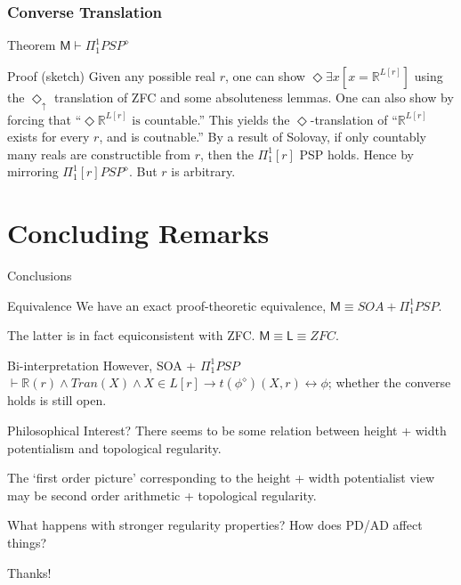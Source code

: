 \documentclass[handout]{beamer}
\begin{document}
\begin{frame}
    \frametitle{Converse Translation}
\begin{block}{Theorem}
$\mathsf{M} \vdash \Pi_1^1 PSP^\diamond$
\end{block}
\begin{block}{Proof (sketch)}
     Given any possible real $r$, one can show $\Diamond \exists x[ x = \mathbb{R}^{L[r]}]$
    using the $\Diamond_\uparrow$ translation of ZFC and some absoluteness lemmas. 
     One can also show by forcing that ``$\Diamond \mathbb{R}^{L[r]} \text{ is countable}$.''
     This yields the $\Diamond$-translation of ``$\mathbb{R}^{L[r]}$ exists for every $r$, and is coutnable.''
     By a result of Solovay, if only countably many reals are constructible 
    from $r$, then the $\Pi_1^1[r]$ PSP holds.
     Hence by mirroring $\Pi_1^1[r] PSP^\diamond$.
     But $r$ is arbitrary.
    
\end{block}
\end{frame}
\section{Concluding Remarks}
\begin{frame}{Conclusions}
    \begin{block}{Equivalence}
        We have an exact proof-theoretic equivalence, $\mathsf{M} \equiv SOA + \Pi_1^1 PSP$.

         The latter is in fact equiconsistent with ZFC. $\mathsf{M} \equiv \mathsf{L} \equiv ZFC$.
    \end{block}
    \begin{block}{Bi-interpretation}
        However, SOA + $\Pi_1^1 PSP$ $\vdash \mathbb{R}(r) \wedge Tran(X) \wedge X \in L[r] \rightarrow t(\phi^\diamond)(X, r) \leftrightarrow \phi$; 
        whether the converse holds is still open.
    \end{block}
    \begin{block}{Philosophical Interest?}
        There seems to be some relation between height + width potentialism 
        and topological regularity.

         The `first order picture' corresponding to the height + width 
        potentialist view may be second order arithmetic + topological regularity.

         What happens with stronger regularity properties? How does 
        PD/AD affect things?
    \end{block}
\end{frame}

\begin{frame}
\Huge{\centerline{Thanks!}}
\end{frame}
\end{document}

